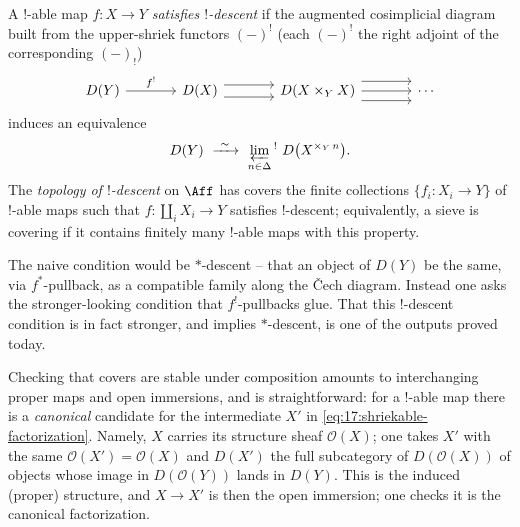 \begin{definition}
\label{def:17:descent}
A $!$-able map $f\colon X\to Y$ \emph{satisfies $!$-descent} if the augmented cosimplicial
diagram built from the upper-shriek functors $(-)^{!}$ (each $(-)^{!}$ the right adjoint of
the corresponding $(-)_{!}$)
\begin{equation*}
\begin{tikzcd}[column sep=large]
D(Y) \arrow[r, "f^{!}"] & D(X) \arrow[r, shift left=1ex, "{}"] \arrow[r, shift right=1ex, "{}"'] & D(X\times_{Y}X) \arrow[r, shift left=1.6ex] \arrow[r] \arrow[r, shift right=1.6ex] & \cdots
\end{tikzcd}
\end{equation*}
induces an equivalence
\begin{equation}
\label{eq:17:shriek-limit}
D(Y)\ \xrightarrow{\ \sim\ }\ \varprojlim_{n\in\Delta}{}^{!}\ D\bigl(X^{\times_{Y}\,n}\bigr).
\end{equation}
The \emph{topology of $!$-descent} on $\Aff$ has covers the finite collections
$\{f_{i}\colon X_{i}\to Y\}$ of $!$-able maps such that $f\colon\coprod_{i}X_{i}\to Y$
satisfies $!$-descent; equivalently, a sieve is covering if it contains finitely many
$!$-able maps with this property.
\end{definition}

\begin{remark}
\label{rmk:17:not-star}
The naive condition would be $*$-descent -- that an object of $D(Y)$ be the same, via
$f^{*}$-pullback, as a compatible family along the \v{C}ech diagram. Instead one asks the
stronger-looking condition that $f^{!}$-pullbacks glue. That this $!$-descent condition
is in fact stronger, and implies $*$-descent, is one of the outputs proved today.
\end{remark}

\begin{remark}
\label{rmk:17:topology-composites}
Checking that covers are stable under composition amounts to interchanging proper maps
and open immersions, and is straightforward: for a $!$-able map there is a
\emph{canonical} candidate for the intermediate $X'$ in \eqref{eq:17:shriekable-factorization}.
Namely, $X$ carries its structure sheaf $\mathcal O(X)$; one takes $X'$ with the same
$\mathcal O(X') = \mathcal O(X)$ and $D(X')$ the full subcategory of $D(\mathcal O(X))$ of
objects whose image in $D(\mathcal O(Y))$ lands in $D(Y)$. This is the induced (proper)
structure, and $X\to X'$ is then the open immersion; one checks it is the canonical
factorization.
\end{remark}


